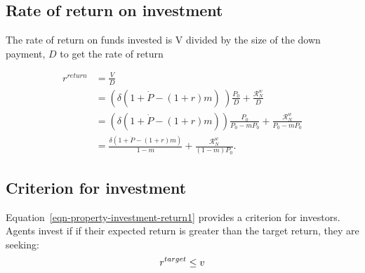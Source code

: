\subsection{Rate of return on investment}
The rate of return on funds invested is V divided by the size of the down payment, $D$ to get the rate of return  

\begin{align}
r^{return} 
  &= \frac{V}{D}  \nonumber \\
  &= \left(\delta \left(1+\dot P - (1+r)m\right) \ \right) \frac{P_0}{D}  + \frac{\mathcal{R}^w_N }{D}      \nonumber \\
  &= \left(\delta \left(1+\dot P - (1+r)m\right)  \right) \frac{P_0}{P_0-mP_0} +  \frac{\mathcal{R}^w_N }{P_0-mP_0}  \\ 
  &= \frac{\delta \left(1+\dot P - (1+r)m\right) }{1-m} +\frac{\mathcal{R}^w_N }{(1-m)P_0}.
\label{eqn-property-investment-return1}
\end{align}

\subsection{Criterion for investment}
Equation~\ref{eqn-property-investment-return1} provides a criterion for investors. Agents invest if if their expected return is greater than the target return, they are seeking:
\begin{equation}\Large
r^{target}\le v 
\label{eqn-property-investment-return2}
\end{equation}




